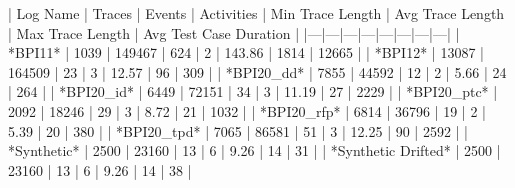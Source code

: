 | Log Name | Traces | Events | Activities | Min Trace Length | Avg Trace Length | Max Trace Length | Avg Test Case Duration |
|---|---|---|---|---|---|---|---|
| *BPI11* | 1039 | 149467 | 624 | 2 | 143.86 | 1814 | 12665 |
| *BPI12* | 13087 | 164509 | 23 | 3 | 12.57 | 96 | 309 |
| *BPI20_dd* | 7855 | 44592 | 12 | 2 | 5.66 | 24 | 264 |
| *BPI20_id* | 6449 | 72151 | 34 | 3 | 11.19 | 27 | 2229 |
| *BPI20_ptc* | 2092 | 18246 | 29 | 3 | 8.72 | 21 | 1032 |
| *BPI20_rfp* | 6814 | 36796 | 19 | 2 | 5.39 | 20 | 380 |
| *BPI20_tpd* | 7065 | 86581 | 51 | 3 | 12.25 | 90 | 2592 |
| *Synthetic* | 2500 | 23160 | 13 | 6 | 9.26 | 14 | 31 |
| *Synthetic Drifted* | 2500 | 23160 | 13 | 6 | 9.26 | 14 | 38 |

